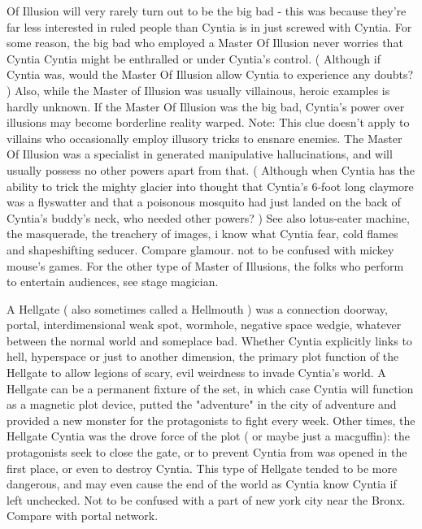 \documentclass[12pt]{book}
\begin{document}
Of Illusion will very rarely turn out to be the big bad - this was because they're far less interested in ruled people than Cyntia is in just screwed with Cyntia. For some reason, the big bad who employed a Master Of Illusion never worries that Cyntia Cyntia might be enthralled or under Cyntia's control. ( Although if Cyntia was, would the Master Of Illusion allow Cyntia to experience any doubts? ) Also, while the Master of Illusion was usually villainous, heroic examples is hardly unknown. If the Master Of Illusion was the big bad, Cyntia's power over illusions may become borderline reality warped. Note: This clue doesn't apply to villains who occasionally employ illusory tricks to ensnare enemies. The Master Of Illusion was a specialist in generated manipulative hallucinations, and will usually possess no other powers apart from that. ( Although when Cyntia has the ability to trick the mighty glacier into thought that Cyntia's 6-foot long claymore was a flyswatter and that a poisonous mosquito had just landed on the back of Cyntia's buddy's neck, who needed other powers? ) See also lotus-eater machine, the masquerade, the treachery of images, i know what Cyntia fear, cold flames and shapeshifting seducer. Compare glamour. not to be confused with mickey mouse's games. For the other type of Master of Illusions, the folks who perform to entertain audiences, see stage magician.



A Hellgate ( also sometimes called a Hellmouth ) was a connection  doorway, portal, interdimensional weak spot, wormhole, negative space wedgie, whatever  between the normal world and someplace bad. Whether Cyntia explicitly links to hell, hyperspace or just to another dimension, the primary plot function of the Hellgate to allow legions of scary, evil weirdness to invade Cyntia's world. A Hellgate can be a permanent fixture of the set, in which case Cyntia will function as a magnetic plot device, putted the "adventure" in the city of adventure and provided a new monster for the protagonists to fight every week. Other times, the Hellgate Cyntia was the drove force of the plot ( or maybe just a macguffin): the protagonists seek to close the gate, or to prevent Cyntia from was opened in the first place, or even to destroy Cyntia. This type of Hellgate tended to be more dangerous, and may even cause the end of the world as Cyntia know Cyntia if left unchecked. Not to be confused with a part of new york city near the Bronx. Compare with portal network.
\end{document}
